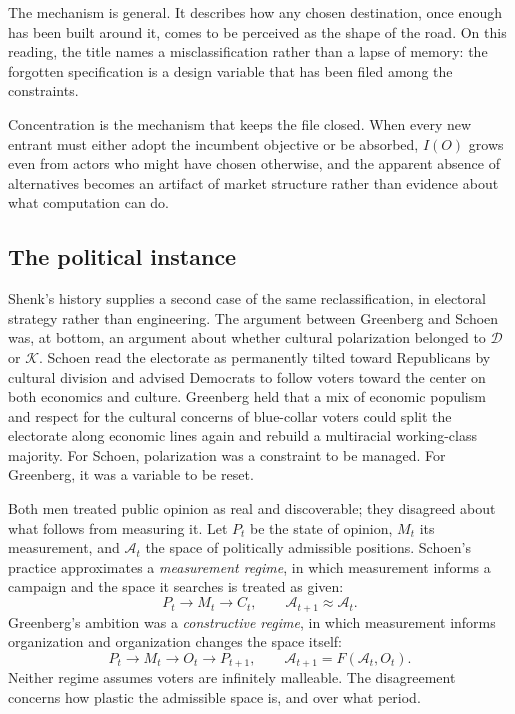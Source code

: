 \documentclass[11pt]{article}
\begin{document}
The mechanism is general. It describes how any chosen destination, once enough has been built around it, comes to be perceived as the shape of the road. On this reading, the title names a misclassification rather than a lapse of memory: the forgotten specification is a design variable that has been filed among the constraints.

Concentration is the mechanism that keeps the file closed. When every new entrant must either adopt the incumbent objective or be absorbed, $I(O)$ grows even from actors who might have chosen otherwise, and the apparent absence of alternatives becomes an artifact of market structure rather than evidence about what computation can do.

\subsection*{The political instance}

Shenk's history supplies a second case of the same reclassification, in electoral strategy rather than engineering. The argument between Greenberg and Schoen was, at bottom, an argument about whether cultural polarization belonged to $\mathcal{D}$ or $\mathcal{K}$. Schoen read the electorate as permanently tilted toward Republicans by cultural division and advised Democrats to follow voters toward the center on both economics and culture. Greenberg held that a mix of economic populism and respect for the cultural concerns of blue-collar voters could split the electorate along economic lines again and rebuild a multiracial working-class majority. For Schoen, polarization was a constraint to be managed. For Greenberg, it was a variable to be reset.

Both men treated public opinion as real and discoverable; they disagreed about what follows from measuring it. Let $P_t$ be the state of opinion, $M_t$ its measurement, and $\mathcal{A}_t$ the space of politically admissible positions. Schoen's practice approximates a \emph{measurement regime}, in which measurement informs a campaign and the space it searches is treated as given:
\[
P_t \to M_t \to C_t, \qquad \mathcal{A}_{t+1} \approx \mathcal{A}_t.
\]
Greenberg's ambition was a \emph{constructive regime}, in which measurement informs organization and organization changes the space itself:
\[
P_t \to M_t \to O_t \to P_{t+1}, \qquad \mathcal{A}_{t+1} = F(\mathcal{A}_t, O_t).
\]
Neither regime assumes voters are infinitely malleable. The disagreement concerns how plastic the admissible space is, and over what period.
\end{document}
